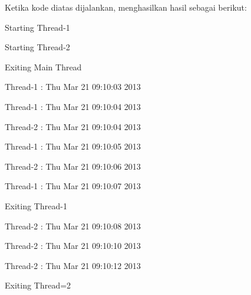 \vspace{12pt}
Ketika kode diatas dijalankan, menghasilkan hasil sebagai berikut:
\par
\noindent 
{\fontsize{10pt}{10pt}\selectfont Starting Thread-1} \par
\noindent 
{\fontsize{10pt}{10pt}\selectfont Starting Thread-2} \par
\noindent 
{\fontsize{10pt}{10pt}\selectfont Exiting Main Thread} \par
\noindent 
{\fontsize{10pt}{10pt}\selectfont Thread-1 : Thu Mar 21 09:10:03 2013} \par
\noindent 
{\fontsize{10pt}{10pt}\selectfont Thread-1 : Thu Mar 21 09:10:04 2013} \par
\noindent 
{\fontsize{10pt}{10pt}\selectfont Thread-2 : Thu Mar 21 09:10:04 2013} \par
\noindent 
{\fontsize{10pt}{10pt}\selectfont Thread-1 : Thu Mar 21 09:10:05 2013} \par
\noindent 
{\fontsize{10pt}{10pt}\selectfont Thread-2 : Thu Mar 21 09:10:06 2013} \par
\noindent 
{\fontsize{10pt}{10pt}\selectfont Thread-1 : Thu Mar 21 09:10:07 2013} \par
\noindent 
{\fontsize{10pt}{10pt}\selectfont Exiting Thread-1} \par
\noindent 
{\fontsize{10pt}{10pt}\selectfont Thread-2 : Thu Mar 21 09:10:08 2013} \par
\noindent 
{\fontsize{10pt}{10pt}\selectfont Thread-2 : Thu Mar 21 09:10:10 2013} \par
\noindent 
{\fontsize{10pt}{10pt}\selectfont Thread-2 : Thu Mar 21 09:10:12 2013} \par
\noindent 
{\fontsize{10pt}{10pt}\selectfont Exiting Thread=2} \par

\vspace{10pt}
